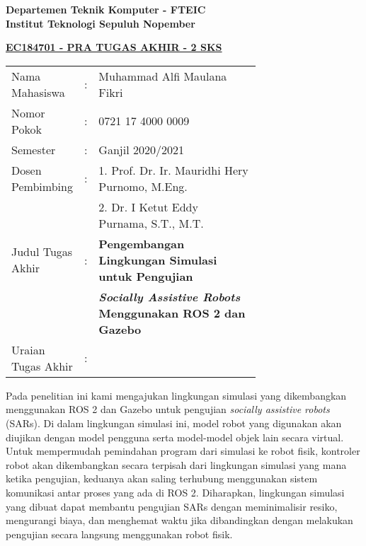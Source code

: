 \begin{flushleft}
  \textbf{Departemen Teknik Komputer - FTEIC}\\
  \textbf{Institut Teknologi Sepuluh Nopember}\\
\end{flushleft}

\begin{center}
  \underline{\textbf{EC184701 - PRA TUGAS AKHIR - 2 SKS}}
\end{center}

\begin{adjustwidth}{-0.2cm}{}
  \begin{tabular}{lcp{0.7\linewidth}}

    Nama Mahasiswa &:& Muhammad Alfi Maulana Fikri \\
    Nomor Pokok &:& 0721 17 4000 0009 \\

    Semester &:& Ganjil 2020/2021 \\

    Dosen Pembimbing &:& 1. Prof. Dr. Ir. Mauridhi Hery Purnomo, M.Eng. \\
    & & 2. Dr. I Ketut Eddy Purnama, S.T., M.T. \\

    Judul Tugas Akhir &:& \textbf{Pengembangan Lingkungan Simulasi untuk Pengujian} \\
    & & \textbf{\emph{Socially Assistive Robots} Menggunakan ROS 2 dan Gazebo} \\

    Uraian Tugas Akhir &:& \\
  \end{tabular}
\end{adjustwidth}

Pada penelitian ini kami mengajukan lingkungan simulasi yang dikembangkan menggunakan ROS 2 dan Gazebo untuk pengujian \emph{socially assistive robots} (SARs).
Di dalam lingkungan simulasi ini, model robot yang digunakan akan diujikan dengan model pengguna serta model-model objek lain secara virtual.
Untuk mempermudah pemindahan program dari simulasi ke robot fisik, kontroler robot akan dikembangkan secara terpisah dari lingkungan simulasi yang mana ketika pengujian, keduanya akan saling terhubung menggunakan sistem komunikasi antar proses yang ada di ROS 2.
Diharapkan, lingkungan simulasi yang dibuat dapat membantu pengujian SARs dengan meminimalisir resiko, mengurangi biaya, dan menghemat waktu jika dibandingkan dengan melakukan pengujian secara langsung menggunakan robot fisik.
\vspace{1ex}

